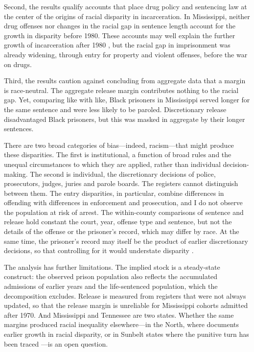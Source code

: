 \documentclass[12pt]{article}
\begin{document}
Second, the results qualify accounts that place drug policy and sentencing law at the center of the origins of racial disparity in incarceration.  In Mississippi, neither drug offenses nor changes in the racial gap in sentence length account for the growth in disparity before 1980.  These accounts may well explain the further growth of incarceration after 1980 \citep{Alexander:2012tj,Pfaff:2017tp}, but the racial gap in imprisonment was already widening, through entry for property and violent offenses, before the war on drugs.

Third, the results caution against concluding from aggregate data that a margin is race-neutral.  The aggregate release margin contributes nothing to the racial gap.  Yet, comparing like with like, Black prisoners in Mississippi served longer for the same sentence and were less likely to be paroled.  Discretionary release disadvantaged Black prisoners, but this was masked in aggregate by their longer sentences.

There are two broad categories of bias---indeed, racism---that might produce these disparities.  The first is institutional, a function of broad rules and the unequal circumstances to which they are applied, rather than individual decision-making.  The second is individual, the discretionary decisions of police, prosecutors, judges, juries and parole boards.  The registers cannot distinguish between them.  The entry disparities, in particular, combine differences in offending with differences in enforcement and prosecution, and I do not observe the population at risk of arrest.  The within-county comparisons of sentence and release hold constant the court, year, offense type and sentence, but not the details of the offense or the prisoner's record, which may differ by race.  At the same time, the prisoner's record may itself be the product of earlier discretionary decisions, so that controlling for it would understate disparity \citep{Tonry:2011hh}.

The analysis has further limitations.  The implied stock is a steady-state construct: the observed prison population also reflects the accumulated admissions of earlier years and the life-sentenced population, which the decomposition excludes.  Release is measured from registers that were not always updated, so that the release margin is unreliable for Mississippi cohorts admitted after 1970.  And Mississippi and Tennessee are two states.  Whether the same margins produced racial inequality elsewhere---in the North, where \cite{Muller:2012wf} documents earlier growth in racial disparity, or in Sunbelt states where the punitive turn has been traced \citep{Lynch:2010rt,Schoenfeld:2018vq}---is an open question.
\end{document}
